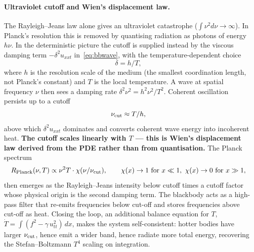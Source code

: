 \documentclass[11pt]{article}
\begin{document}
\paragraph{Ultraviolet cutoff and Wien's displacement law.}
The Rayleigh--Jeans law alone gives an ultraviolet catastrophe ($\int \nu^2 d\nu \to \infty$). In Planck's resolution this is removed by quantising radiation as photons of energy $h\nu$. In the deterministic picture the cutoff is supplied instead by the viscous damping term $-\delta^2 u_{xxt}$ in~\eqref{eq:bbwave}, with the temperature-dependent choice
\begin{equation}
\delta = h/T,
\label{eq:delta-T}
\end{equation}
where $h$ is the resolution scale of the medium (the smallest coordination length, not Planck's constant) and $T$ is the local temperature. A wave at spatial frequency $\nu$ then sees a damping rate $\delta^2 \nu^2 = h^2 \nu^2 / T^2$. Coherent oscillation persists up to a cutoff
\begin{equation}
\nu_{\rm cut} \approx T/h,
\label{eq:cutoff}
\end{equation}
above which $\delta^2 u_{xxt}$ dominates and converts coherent wave energy into incoherent heat. \textbf{The cutoff scales linearly with $T$ --- this is Wien's displacement law derived from the PDE rather than from quantisation.} The Planck spectrum
\begin{equation}
R_{\rm Planck}(\nu, T) \propto \nu^2 T \cdot \chi(\nu/\nu_{\rm cut}), \qquad \chi(x) \to 1 \text{ for } x \ll 1,\ \chi(x) \to 0 \text{ for } x \gg 1,
\end{equation}
then emerges as the Rayleigh--Jeans intensity below cutoff times a cutoff factor whose physical origin is the second damping term. The blackbody acts as a high-pass filter that re-emits frequencies below cut-off and stores frequencies above cut-off as heat. Closing the loop, an additional balance equation for $T$,
$\dot T = \int (f^2 - \gamma\, u_{tt}^2)\,dx$,
makes the system self-consistent: hotter bodies have larger $\nu_{\rm cut}$, hence emit a wider band, hence radiate more total energy, recovering the Stefan--Boltzmann $T^4$ scaling on integration.
\end{document}
